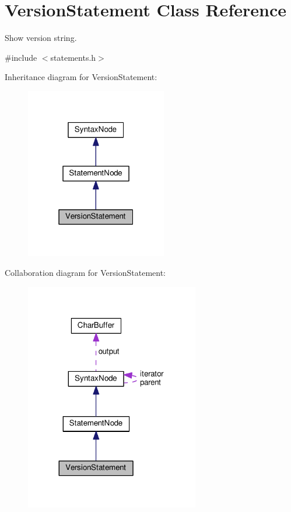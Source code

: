 \hypertarget{classVersionStatement}{}\section{Version\+Statement Class Reference}
\label{classVersionStatement}


Show version string.  




{\ttfamily \#include $<$statements.\+h$>$}



Inheritance diagram for Version\+Statement\+:
\nopagebreak
\begin{figure}[H]
\begin{center}
\leavevmode
\includegraphics[width=175pt]{dd/d1d/classVersionStatement__inherit__graph}
\end{center}
\end{figure}


Collaboration diagram for Version\+Statement\+:
\nopagebreak
\begin{figure}[H]
\begin{center}
\leavevmode
\includegraphics[width=215pt]{da/d76/classVersionStatement__coll__graph}
\end{center}
\end{figure}
